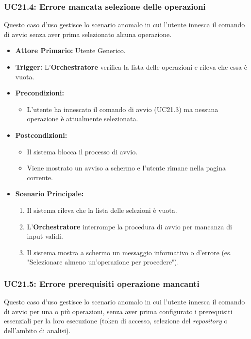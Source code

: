 \documentclass[12pt, a4paper]{article}
\begin{document}
\subsubsection{UC21.4: Errore mancata selezione delle operazioni}\label{uc:21.4}
Questo caso d'uso gestisce lo scenario anomalo in cui l'utente innesca il comando di avvio senza aver prima selezionato alcuna operazione.

\begin{itemize}
    \item \textbf{Attore Primario:} Utente Generico.
    \item \textbf{Trigger:} L'\textbf{Orchestratore} verifica la lista delle operazioni e rileva che essa è vuota.
    \item \textbf{Precondizioni:}
    \begin{itemize}
        \item L'utente ha innescato il comando di avvio (UC21.3) ma nessuna operazione è attualmente selezionata.
    \end{itemize}
    \item \textbf{Postcondizioni:}
    \begin{itemize}
        \item Il sistema blocca il processo di avvio.
        \item Viene mostrato un avviso a schermo e l'utente rimane nella pagina corrente.
    \end{itemize}
    \item \textbf{Scenario Principale:}
    \begin{enumerate}
        \item Il sistema rileva che la lista delle selezioni è vuota.
        \item L'\textbf{Orchestratore} interrompe la procedura di avvio per mancanza di input validi.
        \item Il sistema mostra a schermo un messaggio informativo o d'errore (es. "Selezionare almeno un'operazione per procedere").
    \end{enumerate}
\end{itemize}


\subsubsection{UC21.5: Errore prerequisiti operazione mancanti}\label{uc:21.5}
Questo caso d'uso gestisce lo scenario anomalo in cui l'utente innesca il comando di avvio per una o più operazioni, senza aver prima configurato i prerequisiti essenziali per la loro esecuzione (token di accesso, selezione del \textit{repository} o dell'ambito di analisi).
\end{document}
